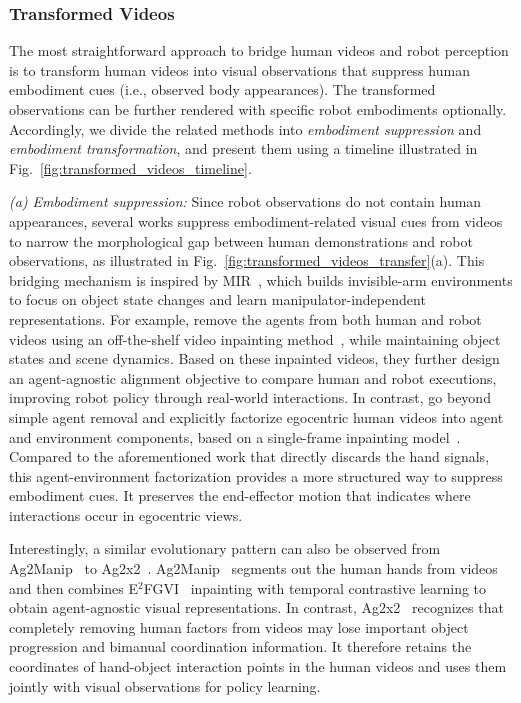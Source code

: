 \documentclass[Afour,sageh,times]{sagej}
\begin{document}
\subsubsection{Transformed Videos} \label{sec:transformed_videos}
The most straightforward approach to bridge human videos and robot perception is to transform human videos into visual observations that suppress human embodiment cues (i.e., observed body appearances). The transformed observations can be further rendered with specific robot embodiments optionally. Accordingly, we divide the related methods into \textit{embodiment suppression} and \textit{embodiment transformation}, and present them using a timeline illustrated in Fig.~\ref{fig:transformed_videos_timeline}.

\textit{(a) Embodiment suppression:} Since robot observations do not contain human appearances, several works suppress embodiment-related visual cues from videos to narrow the morphological gap between human demonstrations and robot observations, as illustrated in Fig.~\ref{fig:transformed_videos_transfer}(a). This bridging mechanism is inspired by MIR~\citep{zhou2021manipulator}, which builds invisible-arm environments to focus on object state changes and learn manipulator-independent representations. For example, \cite{bahl2022human} remove the agents from both human and robot videos using an off-the-shelf video inpainting method~\citep{lee2019copy}, while maintaining object states and scene dynamics. Based on these inpainted videos, they further design an agent-agnostic alignment objective to compare human and robot executions, improving robot policy through real-world interactions. In contrast, \cite{chang2023look} go beyond simple agent removal and explicitly factorize egocentric human videos into agent and environment components, based on a single-frame inpainting model~\citep{rombach2022high}. Compared to the aforementioned work \citep{bahl2022human} that directly discards the hand signals, this agent-environment factorization provides a more structured way to suppress embodiment cues. It preserves the end-effector motion that indicates where interactions occur in egocentric views.

Interestingly, a similar evolutionary pattern can also be observed from Ag2Manip~\citep{li2024ag2manip} to Ag2x2~\citep{xiong2025ag2x2}. Ag2Manip~\citep{li2024ag2manip} segments out the human hands from videos and then combines E$^2$FGVI~\citep{li2022towards} inpainting with temporal contrastive learning to obtain agent-agnostic visual representations. In contrast, Ag2x2~\citep{xiong2025ag2x2} recognizes that completely removing human factors from videos may lose important object progression and bimanual coordination information. It therefore retains the coordinates of hand-object interaction points in the human videos and uses them jointly with visual observations for policy learning. 
\end{document}
